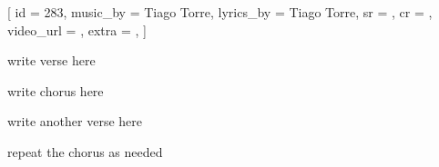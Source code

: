 [
    id          = {283},
    music_by    = {Tiago Torre},
    lyrics_by   = {Tiago Torre},
    sr          = {},
    cr          = {},
    video_url   = {},
    extra       = {},
]

\beginverse
write verse here
\endverse

\beginchorus
write chorus here
\endchorus

\beginverse
write another verse here
\endverse

\beginchorus
repeat the chorus as needed
\endchorus

\endsong
